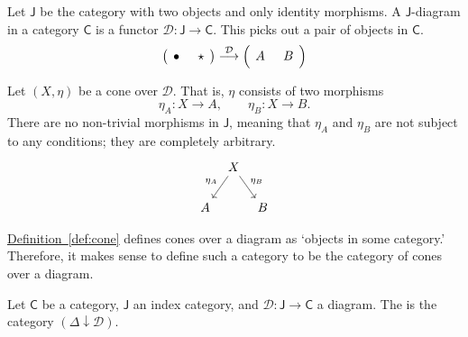 \documentclass[notes.tex]{subfiles}
\begin{document}
\begin{example}
  \label{eg:cone_over_category_with_two_objects_no_morphisms}
  Let $\mathsf{J}$ be the category with two objects and only identity morphisms. A $\mathsf{J}$-diagram in a category $\mathsf{C}$ is a functor $\mathcal{D}\colon \mathsf{J} \to \mathsf{C}$. This picks out a pair of objects in $\mathsf{C}$.
  \begin{equation*}
    \left( \begin{tikzcd}[column sep=tiny]
      \bullet
      & \star
    \end{tikzcd} \right)
    \overset{\mathcal{D}}{\longrightarrow}
    \left( \begin{tikzcd}[column sep=tiny]
      A
      & B
    \end{tikzcd} \right)
  \end{equation*}

  Let $(X, \eta)$ be a cone over $\mathcal{D}$. That is, $\eta$ consists of two morphisms 
  \begin{equation*}
    \eta_{A}\colon X \to A,\qquad \eta_{B}\colon X \to B.
  \end{equation*}
  There are no non-trivial morphisms in $\mathsf{J}$, meaning that $\eta_{A}$ and $\eta_{B}$ are not subject to any conditions; they are completely arbitrary.
  \begin{equation*}
    \begin{tikzcd}[column sep=tiny]
      & X
      \arrow[dl, swap, "\eta_{A}"]
      \arrow[dr, "\eta_{B}"]
      \\
      A
      && B
    \end{tikzcd}
  \end{equation*}
\end{example}

\hyperref[def:cone]{Definition~\ref*{def:cone}} defines cones over a diagram as `objects in some category.' Therefore, it makes sense to define such a category to be the category of cones over a diagram.

\begin{definition}
  \label{def:categoryofconesoveradiagram}
  Let $\mathsf{C}$ be a category, $\mathsf{J}$ an index category, and $\mathcal{D}\colon \mathsf{J} \rightarrow \mathsf{C}$ a diagram. The  is the category $(\Delta \downarrow \mathcal{D})$.
\end{definition}
\end{document}
